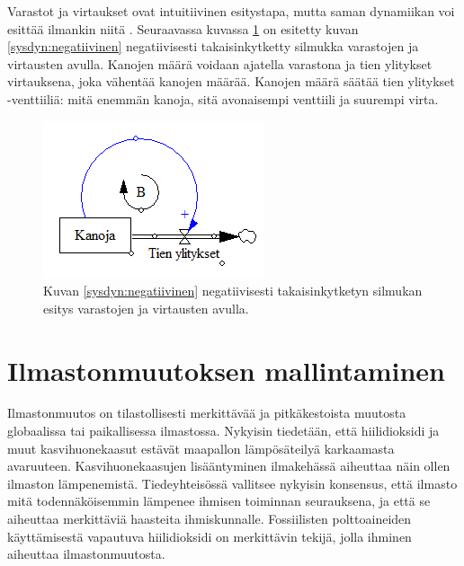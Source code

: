 \documentclass[finnish,12pt,a4paper,pdftex]{article}
\begin{document}
\begin{onehalfspacing}
Varastot ja virtaukset ovat intuitiivinen esitystapa, mutta saman dynamiikan voi esittää ilmankin niitä \cite[s. 191--230]{Sterman2000}. Seuraavassa kuvassa \ref{sysdyn:varastovirtauskana} on esitetty kuvan \ref{sysdyn:negatiivinen} negatiivisesti takaisinkytketty silmukka varastojen ja virtausten avulla. Kanojen määrä voidaan ajatella varastona ja tien ylitykset virtauksena, joka vähentää kanojen määrää. Kanojen määrä säätää tien ylitykset -venttiiliä: mitä enemmän kanoja, sitä avonaisempi venttiili ja suurempi virta. 

\begin{figure}[H]
\centering \includegraphics{varastovirtauskana}
\caption{Kuvan \ref{sysdyn:negatiivinen} negatiivisesti takaisinkytketyn silmukan esitys varastojen ja virtausten avulla. \label{sysdyn:varastovirtauskana}}
\end{figure}


\clearpage
\section{Ilmastonmuutoksen mallintaminen \label{ilmasto}}

Ilmastonmuutos on tilastollisesti merkittävää ja pitkäkestoista muutosta globaalissa tai paikallisessa ilmastossa. Nykyisin tiedetään, että hiilidioksidi ja muut kasvihuonekaasut estävät maapallon lämpösäteilyä karkaamasta avaruuteen. Kasvihuonekaasujen lisääntyminen ilmakehässä aiheuttaa näin ollen ilmaston lämpenemistä. Tiedeyhteisössä vallitsee nykyisin konsensus, että ilmasto mitä todennäköisemmin lämpenee ihmisen toiminnan seurauksena, ja että se aiheuttaa merkittäviä haasteita ihmiskunnalle. Fossiilisten polttoaineiden käyttämisestä vapautuva hiilidioksidi on merkittävin tekijä, jolla ihminen aiheuttaa ilmastonmuutosta. \cite{AmericanInstituteofPhysics} 


\end{onehalfspacing}
\end{document}
